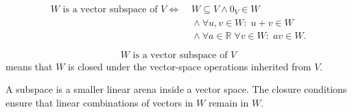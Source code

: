 \begin{remark*}
\[
\begin{aligned}
\text{\(W\) is a vector subspace of \(V\)}
\Longleftrightarrow\;&
W\subseteq V
\land
0_V\in W
\\
&{}\land
\forall u,v\in W{:}\;u+v\in W
\\
&{}\land
\forall a\in\mathbb{R}\;\forall v\in W{:}\;a v\in W.
\end{aligned}
\]
\end{remark*}

\begin{remark*}
\[
\text{\(W\) is a vector subspace of \(V\)}
\]
means that \(W\) is closed under the vector-space operations inherited from
\(V\).
\end{remark*}

\begin{remark*}[Interpretation]
A subspace is a smaller linear arena inside a vector space.  The closure
conditions ensure that linear combinations of vectors in \(W\) remain in
\(W\).
\end{remark*}

\DefinitionalRoot

